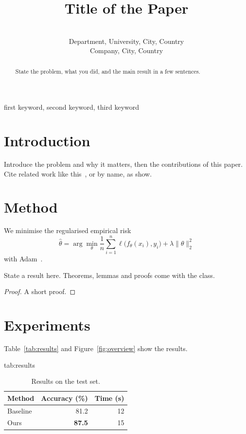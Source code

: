 \documentclass[pmlr]{jmlr}
\title[Short Title]{Title of the Paper}
\author[F. Author and S. Author]{\Name{First Author} \Email{first@example.org}\\
  \addr Department, University, City, Country
  \AND
  \Name{Second Author} \Email{second@example.org}\\
  \addr Company, City, Country}
\begin{document}
\maketitle

\begin{abstract}
State the problem, what you did, and the main result in a few sentences.
\end{abstract}

\begin{keywords}
first keyword, second keyword, third keyword
\end{keywords}

\section{Introduction}
\label{sec:intro}
Introduce the problem and why it matters, then the contributions of this
paper. Cite related work like this~\citep{breiman2001random}, or by name, as
\citet{srivastava2014dropout} show.

\section{Method}
\label{sec:method}
We minimise the regularised empirical risk
\begin{equation}
  \label{eq:risk}
  \hat\theta = \arg\min_\theta \frac{1}{n} \sum_{i=1}^{n} \ell\bigl(f_\theta(x_i), y_i\bigr) + \lambda \lVert\theta\rVert_2^2
\end{equation}
with Adam~\citep{kingma2015adam}.

\begin{theorem}
\label{thm:bound}
State a result here. Theorems, lemmas and proofs come with the class.
\end{theorem}
\begin{proof}
A short proof.
\end{proof}

\section{Experiments}
\label{sec:experiments}
Table~\ref{tab:results} and Figure~\ref{fig:overview} show the results.

\begin{table}[htbp]
  \floatconts
    {tab:results}
    {\caption{Results on the test set.}}
    {\begin{tabular}{lrr}
      \toprule
      Method & Accuracy (\%) & Time (s) \\
      \midrule
      Baseline & 81.2 & 12 \\
      Ours & \textbf{87.5} & 15 \\
      \bottomrule
    \end{tabular}}
\end{table}
\end{document}
